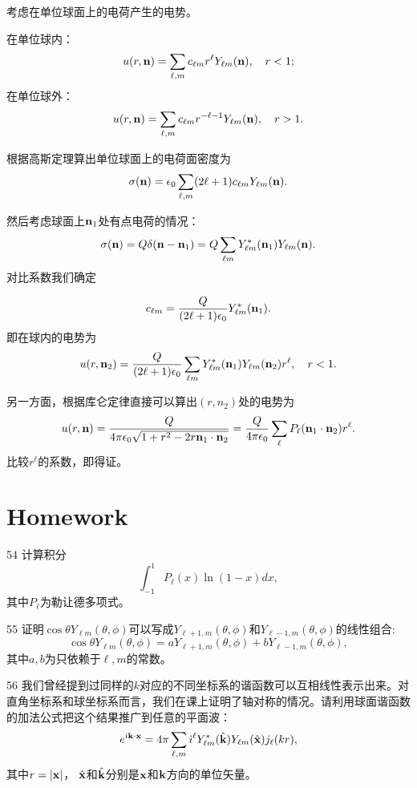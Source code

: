 \documentclass[CJK]{beamer}
\begin{document}
\begin{frame}
  \bch
  考虑在单位球面上的电荷产生的电势。

  在单位球内：
  $$ u(r, {\mathbf{n}}) = \sum_{\ell,m}c_{\ell m}r^\ell Y_{\ell m}({\mathbf{n}}),\ \ \ r<1 ;$$
  在单位球外：
  $$ u(r, {\mathbf{n}}) = \sum_{\ell,m}c_{\ell m}r^{-\ell-1} Y_{\ell m}({\mathbf{n}}),\ \ \ r>1 .$$
  
  根据高斯定理算出单位球面上的电荷面密度为
  $$\sigma({\mathbf{n}}) = \epsilon_0 \sum_{\ell,m}(2\ell+1)c_{\ell m}Y_{\ell m}({\mathbf{n}}).$$
  \ech
\end{frame}


\begin{frame}
  \bch
  然后考虑球面上${\mathbf{n}}_1$处有点电荷的情况：
  $$\sigma({\mathbf{n}}) = Q \delta({\mathbf{n}}-{\mathbf{n}}_1) = Q\sum_{\ell m}Y_{\ell m}^*({\mathbf{n}}_1)Y_{\ell m}({\mathbf{n}}).$$
  对比系数我们确定
  
  $$ c_{\ell m} = \frac{Q}{(2\ell+1)\epsilon_0}  Y_{\ell m}^*({\mathbf{n}}_1). $$
  即在球内的电势为
  $$ u(r,{\mathbf{n}}_2)= \frac{Q}{(2\ell+1)\epsilon_0} \sum_{\ell m} Y_{\ell m}^*({\mathbf{n}}_1)Y_{\ell m}({\mathbf{n}}_2)r^\ell,  \ \ \ r<1. $$
  \ech
\end{frame}

\begin{frame}
  \bch
  另一方面，根据库仑定律直接可以算出$(r, n_2)$处的电势为
  $$u(r,{\mathbf{n}}) = \frac{Q}{4\pi\epsilon_0\sqrt{1+r^2-2r{\mathbf{n}}_1\cdot{\mathbf{n}}_2}} = \frac{Q}{4\pi\epsilon_0}\sum_{\ell}P_\ell({\mathbf{n}}_1\cdot{\mathbf{n}}_2) r^\ell .$$
  比较$r^\ell$的系数，即得证。
  \ech
\end{frame}


\section{Homework}



\begin{frame}
\bch
\bitem
\item[54]{计算积分
  $$\int_{-1}^1 P_\ell(x)\ln(1-x)dx, $$
其中$P_\ell$为勒让德多项式。}
\item[55]{证明$\cos\theta Y_{\ell m}(\theta,\phi)$可以写成$Y_{\ell+1,m}(\theta,\phi)$和$Y_{\ell-1,m}(\theta,\phi)$的线性组合:
  $$ \cos\theta Y_{\ell m}(\theta,\phi) = a Y_{\ell+1,m}(\theta,\phi)+ b Y_{\ell-1,m}(\theta,\phi), $$
  其中$a, b$为只依赖于$\ell, m$的常数。
}
\eitem
\ech
\end{frame}


\begin{frame}
\bch
\bitem
\item[56]{我们曾经提到过同样的$k$对应的不同坐标系的谐函数可以互相线性表示出来。对直角坐标系和球坐标系而言，我们在课上证明了轴对称的情况。请利用球面谐函数的加法公式把这个结果推广到任意的平面波：
  $$ e^{{\dot{\imath}} {\mathbf{k}}\cdot{\mathbf{x}}} = 4\pi \sum_{\ell, m}{\dot{\imath}}^\ell Y_{\ell m}^*(\hat{{\mathbf{k}}})Y_{\ell m}(\hat{{\mathbf{x}}})j_{\ell}(kr),$$
其中$r=|{\mathbf{x}}|$， $\hat{{\mathbf{x}}}$和$\hat{{\mathbf{k}}}$分别是${\mathbf{x}}$和${\mathbf{k}}$方向的单位矢量。}
\eitem
\ech
\end{frame}
\end{document}

